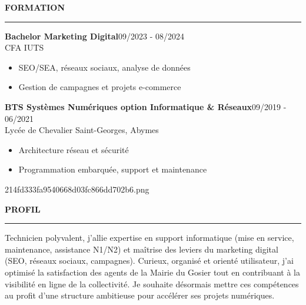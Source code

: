 \documentclass{article}
\newcommand{\cvsection}[1]{%
  \par\bigskip
  {\bfseries\Large #1}\par
  \noindent\rule{\linewidth}{0.8pt}\par\medskip}
\begin{document}
\begin{paracol}{2}
\cvsection{FORMATION}
\colorbox{maincolor}{%
  \begin{minipage}{\linewidth}
    \noindent
    \textbf{Bachelor Marketing Digital}\hfill 09/2023 - 08/2024\\
    CFA IUTS\\[-0.3em]
    \begin{itemize}[leftmargin=*]
      \item SEO/SEA, réseaux sociaux, analyse de données \item Gestion de campagnes et projets e-commerce
    \end{itemize}
  \end{minipage}}

\vspace{3mm}

\colorbox{maincolor}{%
  \begin{minipage}{\linewidth}
    \noindent
    \textbf{BTS Systèmes Numériques option Informatique \& Réseaux}\hfill 09/2019 - 06/2021\\
    Lycée de Chevalier Saint-Georges, Abymes\\[-0.3em]
    \begin{itemize}[leftmargin=*]
      \item Architecture réseau et sécurité \item Programmation embarquée, support et maintenance
    \end{itemize}
  \end{minipage}}

\switchcolumn\color{white}\hspace*{0.4cm}\begin{minipage}{0.88\linewidth}

\centering
\ifx\relax214fd333fa9540668d03fc866dd702b6.png\relax\else
\fi

\cvsection{PROFIL}
\begingroup           %
\justifying         %
  Technicien polyvalent, j’allie expertise en support informatique (mise en service, maintenance, assistance N1/N2) et maîtrise des leviers du marketing digital (SEO, réseaux sociaux, campagnes). Curieux, organisé et orienté utilisateur, j’ai optimisé la satisfaction des agents de la Mairie du Gosier tout en contribuant à la visibilité en ligne de la collectivité. Je souhaite désormais mettre ces compétences au profit d’une structure ambitieuse pour accélérer ses projets numériques.
\endgroup             %


\end{minipage}
\end{paracol}
\end{document}
